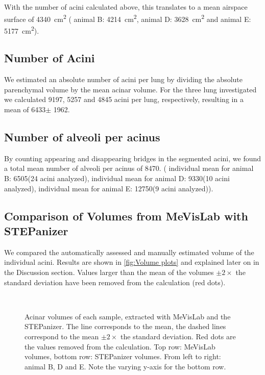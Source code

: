 \documentclass[a4paper,DIVcalc,abstract,english]{scrartcl}
\newcommand{\numberofaciniB}{24}
\newcommand{\numberofaciniD}{10}
\newcommand{\numberofaciniE}{9}
\newcommand{\biggerthan}{2} %
\newcommand{\totalnumberofaciniB}{9197}
\newcommand{\totalnumberofaciniD}{5257}
\newcommand{\totalnumberofaciniE}{4845}
\newcommand{\meantotalnumberofacini}{6433}
\newcommand{\meantotalnumberofaciniSTD}{1962} %
\newcommand{\numberofalveoliB}{6505}
\newcommand{\numberofalveoliD}{9330}
\newcommand{\numberofalveoliE}{12750}
\newcommand{\meannumberofalveoli}{8470} %
\newcommand{\airspacesurfaceB}{4214} %
\newcommand{\airspacesurfaceD}{3628} %
\newcommand{\airspacesurfaceE}{5177} %
\newcommand{\meanairspacesurface}{4340} %
\begin{document}
With the number of acini calculated above, this translates to a mean airspace surface of \SI{\meanairspacesurface}{\centi\metre\squared} (%
animal B: \SI{\airspacesurfaceB}{\centi\metre\squared},
animal D: \SI{\airspacesurfaceD}{\centi\metre\squared} and
animal E: \SI{\airspacesurfaceE}{\centi\metre\squared}).

\subsection{Number of Acini}
We estimated an absolute number of acini per lung by dividing the absolute parenchymal volume by the mean acinar volume.
For the three lung investigated we calculated \totalnumberofaciniB, \totalnumberofaciniD\xspace and \totalnumberofaciniE\xspace acini per lung, respectively, resulting in a mean of \meantotalnumberofacini\xspace \(\pm\) \meantotalnumberofaciniSTD.

\subsection{Number of alveoli per acinus}
By counting appearing and disappearing bridges in the segmented acini, we found a total mean number of alveoli per acinus of \meannumberofalveoli. (%
individual mean for animal B: \numberofalveoliB\xspace (\numberofaciniB\xspace acini analyzed),
individual mean for animal D: \numberofalveoliD\xspace (\numberofaciniD\xspace acini analyzed),
individual mean for animal E: \numberofalveoliE\xspace (\numberofaciniE\xspace acini analyzed)).

\subsection{Comparison of Volumes from MeVisLab with STEPanizer}
We compared the automatically assessed and manually estimated volume of the individual acini. Results are shown in \autoref{fig:Volume plots} and explained later on in the Discussion section. Values larger than the mean of the volumes \(\pm\biggerthan\times\) the standard deviation have been removed from the calculation (red dots).

\begin{figure}[htb]
	\centering
	\subfloat{
		}\hfill%
	\subfloat{
		
		}\hfill%
	\subfloat{
		
		}\\%
	\subfloat{
		
		}\hfill%
	\subfloat{
		
		}\hfill%
	\subfloat{
		
		}%
	\caption{Acinar volumes of each sample, extracted with MeVisLab and the STEPanizer. The line corresponds to the mean, the dashed lines correspond to the mean \(\pm\biggerthan\times\) the standard deviation. Red dots are the values removed from the calculation. Top row: MeVisLab volumes, bottom row: STEPanizer volumes. From left to right: animal B, D and E. Note the varying y-axis for the bottom row.}
	\label{fig:Volume plots}
\end{figure}
\end{document}
